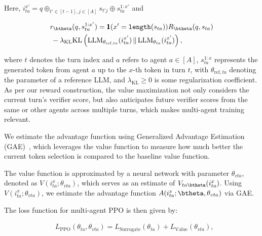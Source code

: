 \noindent Here, \( i_{ta}^{x'} = q \oplus_{t' \in [t-1], j \in [A]} s_{t'j} \oplus s^{1:{x'}}_{ta} \) and 

\safevspace{-4mm}

{
\small
\begin{align*}
    &r_{\btheta}(q, s_{ta}^{1:x'}) = \pmb{1}(x' = \texttt{length}(s_{ta})) R_{\btheta}(q, s_{ta}) 
\\
&\, -\lambda_{\text{KL}} \text{KL}\left(\text{LLM}_{\theta_{\text{ref},ta}}(i_{ta}^{x'}) \,\|\, \text{LLM}_{\theta_{ta}}(i_{ta}^{x'})\right), 
\end{align*}
}

\safevspace{-4mm}


\noindent where $t$ denotes the turn index and $a$ refers to agent  $a \in [A]$, $s_{ta}^{1:x}$ represents the generated token from agent $a$ up to the $x$-th token in turn $t$, with $\theta_{\text{ref},ta}$  denoting the parameter of a reference LLM, and  \( \lambda_{\text{KL}}\geq 0\) is some regularization coefficient. As per our reward construction, the value maximization 
not only considers the current turn’s verifier score,  but also anticipates future verifier scores from the same or other agents across multiple turns, which makes multi-agent training {relevant}. {We estimate the advantage function using Generalized Advantage Estimation (GAE)~\citep{schulman2015high}, which leverages the value function to measure how much better the current token selection is compared to the baseline value function.  

The value function is approximated by a neural network with parameter \(\theta_{vta}\), denoted as \(V(i_{ta}^x;\theta_{vta})\), which serves as an estimate of \(V_{ta\btheta}(i_{ta}^x)\). Using \(V(i_{ta}^x;\theta_{vta})\), we estimate the advantage function \(A(i_{ta}^x;\btheta, \theta_{vta})\) via GAE. } The loss function for multi-agent PPO is then given by: 
\safevspace{-5mm}


\begin{align*}
    &L_{\text{PPO}}(\theta_{ta}, \theta_{vta})  = L_{\text{Surrogate}}(\theta_{ta}) + L_{\text{Value}}(\theta_{vta}),
\end{align*}
\safevspace{-8mm}

